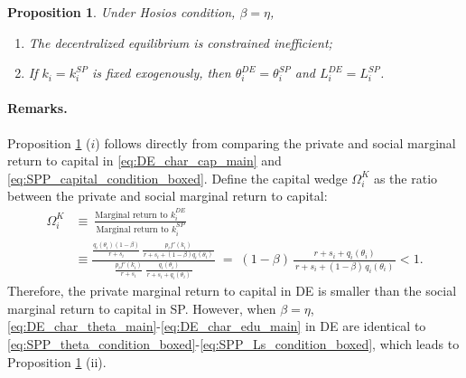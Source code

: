 \documentclass[12pt]{article} %
\newtheorem{proposition}{Proposition}
\theoremstyle{definition}
\begin{document}
\begin{proposition}\label{prop_efficiency_hosios}
    Under Hosios condition, $\beta=\eta$,
    \begin{enumerate}
        \item[(i)] The decentralized equilibrium is constrained inefficient;
        \item[(ii)]  If  $k_i = k_i^{SP}$ is fixed exogenously, then $\theta^{DE}_i = \theta^{SP}_i$ and $L_i^{DE}=L_i^{SP}$. 
    \end{enumerate}
\end{proposition}





\paragraph{Remarks.} Proposition \ref{prop_efficiency_hosios} ($i$) follows directly from comparing the private and social marginal return to  capital in  \eqref{eq:DE_char_cap_main} and \eqref{eq:SPP_capital_condition_boxed}. Define the capital wedge $\Omega_i^K$ as the ratio between  the private and social marginal return to capital:
\begin{align}
\Omega_i^{K} & \equiv\ \frac{\text{Marginal return to  $k$}_i^{DE}}{\text{Marginal  return to $k$}_i^{SP}}  \nonumber\\
 & \equiv \frac{\frac{q_i(\theta_i)(1-\beta)}{r+s_i}\,\frac{p_i f'(k_i)}{\,r+s_i+(1-\beta)q_i(\theta_i)\,}}{\frac{p_i f'(k_i)}{r+s_i}\;\frac{q_i(\theta_i)}{\,r+s_i + q_i(\theta_i)\,}}
\;=\;(1-\beta)\,\frac{\,r+s_i+q_i(\theta_i)\,}{\,r+s_i+(1-\beta)\,q_i(\theta_i)\,}<1.
\end{align}
Therefore, the private marginal return to capital in DE is smaller than the social marginal return to capital in SP.   However, when $\beta=\eta$, \eqref{eq:DE_char_theta_main}-\eqref{eq:DE_char_edu_main} in DE are identical to \eqref{eq:SPP_theta_condition_boxed}-\eqref{eq:SPP_Ls_condition_boxed}, which leads to Proposition \ref{prop_efficiency_hosios} (ii). 
\end{document}

